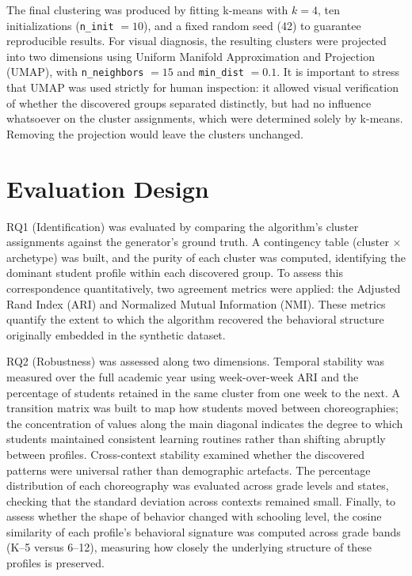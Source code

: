 The final clustering was produced by fitting k-means with $k=4$, ten initializations (\texttt{n\_init} $= 10$), and a fixed random seed (42) to guarantee reproducible results. For visual diagnosis, the resulting clusters were projected into two dimensions using Uniform Manifold Approximation and Projection (UMAP), with \texttt{n\_neighbors} $= 15$ and \texttt{min\_dist} $= 0.1$. It is important to stress that UMAP was used strictly for human inspection: it allowed visual verification of whether the discovered groups separated distinctly, but had no influence whatsoever on the cluster assignments, which were determined solely by k-means. Removing the projection would leave the clusters unchanged.

\section{Evaluation Design}
\label{sec:evaluation-design}
RQ1 (Identification) was evaluated by comparing the algorithm's cluster assignments against the generator's ground truth. A contingency table (cluster $\times$ archetype) was built, and the purity of each cluster was computed, identifying the dominant student profile within each discovered group. To assess this correspondence quantitatively, two agreement metrics were applied: the Adjusted Rand Index (ARI) and Normalized Mutual Information (NMI). These metrics quantify the extent to which the algorithm recovered the behavioral structure originally embedded in the synthetic dataset.

RQ2 (Robustness) was assessed along two dimensions. Temporal stability was measured over the full academic year using week-over-week ARI and the percentage of students retained in the same cluster from one week to the next. A transition matrix was built to map how students moved between choreographies; the concentration of values along the main diagonal indicates the degree to which students maintained consistent learning routines rather than shifting abruptly between profiles. Cross-context stability examined whether the discovered patterns were universal rather than demographic artefacts. The percentage distribution of each choreography was evaluated across grade levels and states, checking that the standard deviation across contexts remained small. Finally, to assess whether the shape of behavior changed with schooling level, the cosine similarity of each profile's behavioral signature was computed across grade bands (K--5 versus 6--12), measuring how closely the underlying structure of these profiles is preserved.

